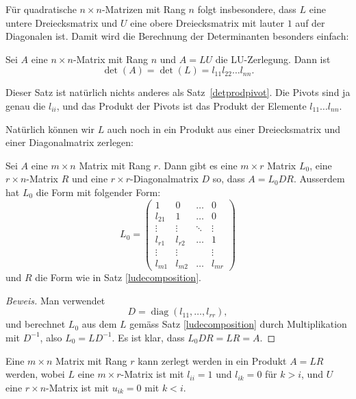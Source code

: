 Für quadratische $n\times n$-Matrizen mit Rang $n$ folgt insbesondere,
dass $L$ eine untere Dreiecksmatrix und $U$ eine obere Dreiecksmatrix
mit lauter $1$ auf der Diagonalen ist.
Damit wird die Berechnung der
Determinanten besonders einfach:

\begin{satz}
Sei $A$ eine $n\times n$-Matrix mit Rang $n$ und $A=LU$ die LU-Zerlegung.
Dann ist
\[
\det(A)=\det(L)=l_{11}l_{22}\dots l_{nn}.
\]
\end{satz}

Dieser Satz ist natürlich nichts anderes als Satz~\ref{detprodpivot}.
Die Pivots sind ja genau die $l_{ii}$, und 
das Produkt der Pivots ist das Produkt der Elemente
$l_{11}\dots l_{nn}$.

Natürlich können wir $L$ auch noch in ein Produkt aus einer
Dreiecksmatrix und einer Diagonalmatrix zerlegen:

\begin{satz}
\label{ldrdecomposition}
Sei $A$ eine $m\times n$ Matrix mit Rang $r$.
Dann gibt es eine $m\times r$ Matrix $L_0$, eine $r\times n$-Matrix $R$
und eine $r\times r$-Diagonalmatrix $D$
so, dass $A=L_0DR$.
Ausserdem hat $L_0$ die Form mit folgender Form:
\[
L_0=\begin{pmatrix}
1     &0&\dots&0\\
l_{21}&1     &\dots&0\\
\vdots&\vdots&\ddots&\vdots\\
l_{r1}&l_{r2}&\dots&1     \\
\vdots&\vdots& &\vdots\\
l_{m1}&l_{m2}&\dots&l_{mr}
\end{pmatrix}
\]
und $R$ die Form wie in Satz \ref{ludecomposition}.
\end{satz}

\begin{proof}[Beweis]
Man verwendet 
\[
D=\operatorname{diag}(l_{11},\dots,l_{rr}),
\]
und berechnet $L_0$ aus dem $L$ gemäss Satz \ref{ludecomposition} durch
Multiplikation mit $D^{-1}$, also $L_0=LD^{-1}$.
Es ist klar, dass
$L_0DR=LR=A$.
\end{proof}

\begin{satz}[LR-Zerlegung]
Eine $m\times n$ Matrix mit Rang $r$ kann zerlegt werden in ein Produkt $A=LR$
werden, wobei $L$ eine $m\times r$-Matrix ist mit $l_{ii}=1$ und $l_{ik}=0$
für $k>i$, und $U$ eine $r\times n$-Matrix ist mit $u_{ik}=0$ mit $k<i$.
\end{satz}

